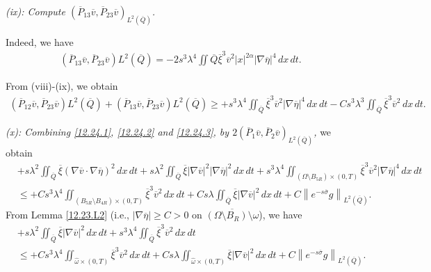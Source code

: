\documentclass[11pt]{article}
\numberwithin{equation}{section}
\begin{document}
{\it (ix): Compute $(\overline{P}_{13}\overline{v}, \overline{P}_{23}\overline{v})_{L^2(\overline{Q})}$.}

Indeed, we have
\begin{equation*}
	\begin{split}
		(\overline{P}_{13}\overline{v}, \overline{P}_{23}\overline{v}){L^2(\overline{Q})}=-2s^3\lambda^4\iint{\overline{Q}}\overline{\xi}^3 \overline{v}^2 |x|^{2\alpha}|\nabla \overline{\eta}|^4\,dx\,dt.
	\end{split}
\end{equation*}

From (viii)-(ix), we obtain
\begin{equation}\label{12.24.4}
	\begin{split}
		(\overline{P}_{12}\overline{v}, \overline{P}_{23}\overline{v}){L^2(\overline{Q})}+(\overline{P}_{13}\overline{v}, \overline{P}_{23}\overline{v}){L^2(\overline{Q})}\geq+ s^3\lambda^4\iint_{\overline{Q}}\overline{\xi}^3\overline{v}^2|\nabla\overline{\eta}|^4\,dx\,dt-Cs^3\lambda^3\iint_{\overline{Q}}\overline{\xi}^3\overline{v}^2\,dx\,dt.
	\end{split}
\end{equation}

{\it (x): Combining \eqref{12.24.1}, \eqref{12.24.2} and \eqref{12.24.3}, by $2(\overline{P}_1\overline{v}, \overline{P}_2\overline{v})_{L^2(\overline{Q})}$,}  we obtain
\begin{equation*}
	\begin{split}
		&+s\lambda^2\iint_{\overline{Q}}\overline{\xi} (\nabla\overline{v}\cdot \nabla \overline{\eta})^2\,dx\,dt+s\lambda^2\iint_{\overline{Q}}\overline{\xi} |\nabla \overline{v}|^2|\nabla \overline{\eta}|^2\,dx\,dt +s^3\lambda^4\iint_{(\Omega\setminus B_{5R})\times (0,T)}\overline{\xi}^3\overline{v}^2|\nabla\overline{\eta}|^4\,dx\,dt\\
		&\leq +Cs^3\lambda^4\iint_{(B_{5R}\setminus B_{4R})\times (0,T)}\overline{\xi} ^3\overline{v}^2\,dx\,dt+Cs\lambda \iint_{\overline{Q}}\overline{\xi} |\nabla \overline{v}|^2\,dx\,dt+C\left\|e^{-s\overline{\sigma}}g\right\|_{L^2(\overline{Q})}.
	\end{split}
\end{equation*}
From Lemma \ref{12.23.L2} (i.e., $|\nabla \overline{\eta}|\geq C>0$ on $\overline{(\Omega\setminus B_R)\setminus \widehat{\omega}}$), we have
\begin{equation}\label{12.24.5}
	\begin{split}
		&+s\lambda^2\iint_{\overline{Q}}\overline{\xi} |\nabla \overline{v}|^2 \,dx\,dt +s^3\lambda^4\iint_{\overline{Q}}\overline{\xi}^3\overline{v}^2 \,dx\,dt\\
		&\leq +Cs^3\lambda^4\iint_{\widehat{\omega} \times (0,T)}\overline{\xi} ^3\overline{v}^2\,dx\,dt+Cs\lambda \iint_{\widehat{\omega} \times (0,T)}\overline{\xi} |\nabla \overline{v}|^2\,dx\,dt+C\left\|e^{-s\overline{\sigma}}g\right\|_{L^2(\overline{Q})}.
	\end{split}
\end{equation}
\end{document}
